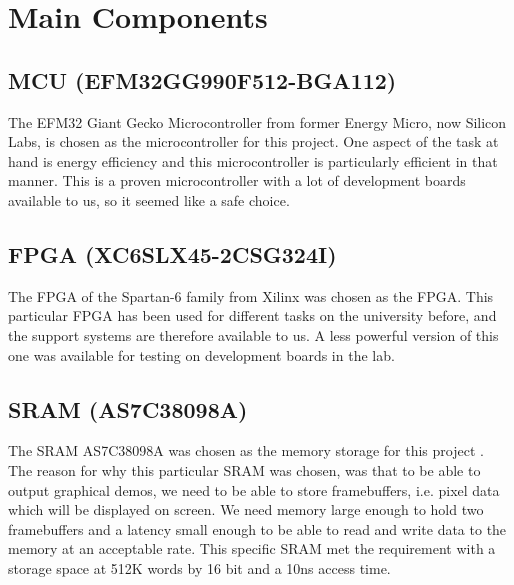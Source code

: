 \documentclass[../main/report.tex]{subfiles}
\begin{document}
\section{Main Components}

\subsection*{MCU (EFM32GG990F512-BGA112)}
The EFM32 Giant Gecko Microcontroller from former Energy Micro, now Silicon Labs, is chosen as the microcontroller for this project.
One aspect of the task at hand is energy efficiency and this microcontroller is particularly efficient in that manner.
This is a proven microcontroller with a lot of development boards available to us, so it seemed like a safe choice.

\subsection*{FPGA (XC6SLX45-2CSG324I)}
The FPGA of the Spartan-6 family from Xilinx was chosen as the FPGA.
This particular FPGA has been used for different tasks on the university before, and the support systems are therefore available to us.
A less powerful version of this one was available for testing on development boards in the lab.

\subsection*{SRAM (AS7C38098A)}
The SRAM AS7C38098A was chosen as the memory storage for this project \cite{SRAM-datasheet}.
The reason for why this particular SRAM was chosen, was that to be able to output graphical demos, we need to be able to store framebuffers, i.e. pixel data which will be displayed on screen.
We need memory large enough to hold two framebuffers and a latency small enough to be able to read and write data to the memory at an acceptable rate.
This specific SRAM met the requirement with a storage space at 512K words by 16 bit and a 10ns access time.
\end{document}
